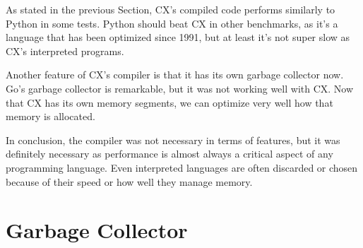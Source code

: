 \documentclass[11pt,fleqn,openany]{book} %
\begin{document}
As stated in the previous Section, CX's compiled code performs similarly to Python in some tests. Python should beat CX in other benchmarks, as it's a language that has been optimized since 1991, but at least it's not super slow as CX's interpreted programs.

Another feature of CX's compiler is that it has its own garbage collector now. Go's garbage collector is remarkable, but it was not working well with CX. Now that CX has its own memory segments, we can optimize very well how that memory is allocated.


In conclusion, the compiler was not necessary in terms of features, but it was definitely necessary as performance is almost always a critical aspect of any programming language. Even interpreted languages are often discarded or chosen because of their speed or how well they manage memory.


\chapter{Garbage Collector}
\label{chapter:garbage-collector}
\end{document}
